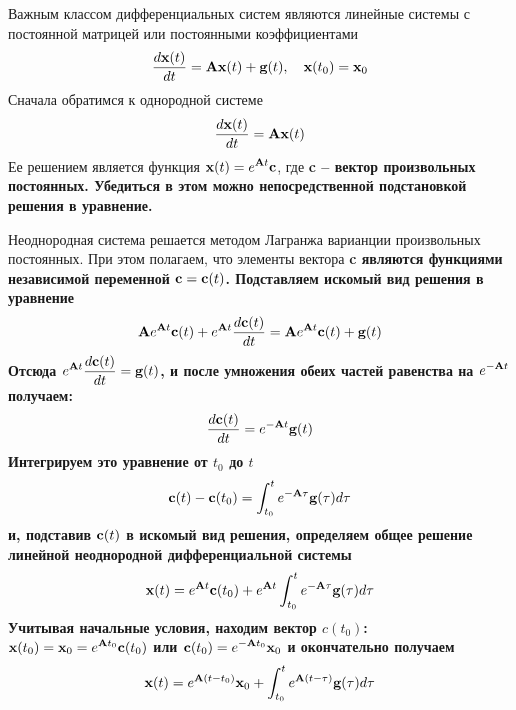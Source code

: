 \documentclass[../../calc-math-exam-2023.tex]{subfiles}
\begin{document}
    Важным классом дифференциальных систем являются линейные системы с постоянной матрицей или постоянными коэффициентами
    \begin{equation}
        \frac{d\bf{x}(t)}{dt} = \bf{A}\bf{x}(t) + \bf{g}(t), \quad \bf{x}(t_0) = \bf{x}_0
    \end{equation}
    Сначала обратимся к однородной системе
    \begin{equation*}
        \frac{d\bf{x}(t)}{dt} = \bf{A}\bf{x}(t)
    \end{equation*}
    Ее решением является функция $\displaystyle \bf{x}(t) = e^{\bf{A}t} \bf{c}$, где \bf{c} -- вектор произвольных
    постоянных. Убедиться в этом можно непосредственной подстановкой решения в уравнение.
    \vspace{10pt}

    Неоднородная система решается методом Лагранжа варианции произвольных постоянных. При этом полагаем, что элементы
    вектора \bf{c} являются функциями независимой переменной $\bf{c} = \bf{c}(t)$. Подставляем искомый вид решения
    в уравнение
    \begin{equation*}
        \bf{A}e^{\bf{A}t}\bf{c}(t) + e^{\bf{A}t}\frac{d\bf{c}(t)}{dt} = \bf{A} e^{\bf{A}t}\bf{c}(t) + \bf{g}(t)
    \end{equation*}
    Отсюда $\displaystyle e^{\bf{A}t}\frac{d\bf{c}(t)}{dt} = \bf{g}(t)$, и после умножения обеих частей равенства на
    $\displaystyle e^{-\bf{A}t}$ получаем:
    \begin{equation*}
        \frac{d\bf{c}(t)}{dt} = e^{-\bf{A}t}\bf{g}(t)
    \end{equation*}
    Интегрируем это уравнение от $t_0$ до $t$
    \begin{equation*}
        \bf{c}(t) - \bf{c}(t_0) = \int_{t_0}^{t} e^{-\bf{A}\tau}\bf{g}(\tau)d\tau
    \end{equation*}
    и, подставив $\bf{c}(t)$ в искомый вид решения, определяем общее решение линейной неоднородной дифференциальной системы
    \begin{equation*}
        \bf{x}(t) = e^{\bf{A}t}\bf{c}(t_0) + e^{\bf{A}t}\int_{t_0}^{t}e^{-\bf{A}\tau}\bf{g}(\tau)d\tau
    \end{equation*}
    Учитывая начальные условия, находим вектор $\displaystyle c(t_0)$: $\displaystyle \bf{x}(t_0) = \bf{x}_0 = e^{\bf{A}t_0}\bf{c}(t_0)$
    или $\displaystyle \bf{c}(t_0) = e^{-\bf{A}t_0}\bf{x}_0$ и окончательно получаем
    \begin{equation*}
        \bf{x}(t) = e^{\bf{A}(t - t_0)}\bf{x}_0 + \int_{t_0}^{t} e^{\bf{A}(t - \tau)}\bf{g}(\tau)d\tau
    \end{equation*}
\end{document}
